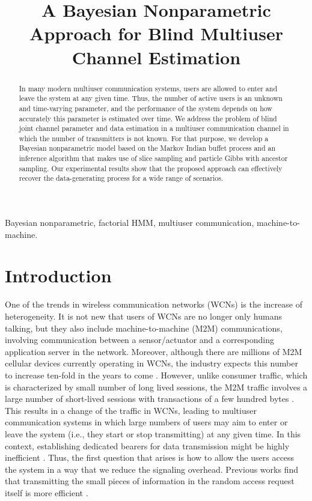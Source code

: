 \documentclass[a4paper]{article}
\title{A Bayesian Nonparametric Approach for Blind Multiuser Channel Estimation}
\begin{document}
%
\maketitle
%
\begin{abstract}
In many modern multiuser communication systems, users are allowed to enter and leave the system at any given time. Thus, the number of active users is an unknown and time-varying parameter, and the performance of the system depends on how accurately this parameter is estimated over time. We address the problem of blind joint channel parameter and data estimation in a multiuser communication channel in which the number of transmitters is not known. For that purpose, we develop a Bayesian nonparametric model based on the Markov Indian buffet process and an inference algorithm that makes use of slice sampling and particle Gibbs with ancestor sampling. Our experimental results show that the proposed approach can effectively recover the data-generating process for a wide range of scenarios.
\end{abstract}
%
\begin{keywords}
Bayesian nonparametric, factorial HMM, multiuser communication, machine-to-machine.
\end{keywords}
%
\section{Introduction}
\label{sec:intro}
One of the trends in wireless communication networks (WCNs) is the increase of heterogeneity. It is not new that users of WCNs are no longer only humans talking, but they also include machine-to-machine (M2M) communications, involving communication between a sensor/actuator and a corresponding application server in the network. Moreover, although there are millions of M2M cellular devices currently operating in WCNs, the industry expects this number to increase ten-fold in the years to come \cite{Dhillon2013}.
%
However, unlike consumer traffic, which is characterized by small number of long lived sessions, the M2M traffic involves a large number of short-lived sessions with transactions of a few hundred bytes  \cite{Dhillon2013}.  
%
This results in a change of the traffic in WCNs,  leading to multiuser communication systems in which large numbers of users may aim to enter or leave  the system (i.e., they start or stop transmitting) at any given time. 
%
In this context,  establishing dedicated bearers for data transmission might be highly inefficient \cite{Dhillon2013}. Thus, the first question that arises is how to allow the users access the system in a way that we reduce the signaling overhead. Previous works find that transmitting the small pieces of information in the random access request itself is more efficient \cite{Chen2010}. 
\end{document}
